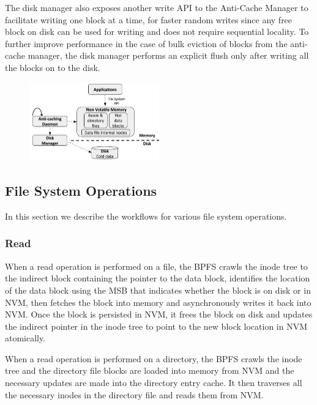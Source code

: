 The disk manager also exposes another write API to the Anti-Cache Manager to facilitate writing one block at a time, for faster random writes since any free block on disk can be used for writing and does not require sequential locality. To further improve performance in the case of bulk eviction of blocks from the anti-cache manager, the disk manager performs an explicit flush only after writing all the blocks on to the disk.

\begin{figure}
\centering
\vspace{-0.2in}
\includegraphics[width=0.5\textwidth]{figs/bpfs.pdf}
\vspace{-0.2in}
\end{figure}

\subsection{File System Operations}
In this section we describe the workflows for various file system operations.
\subsubsection{Read}
When a read operation is performed on a file, the BPFS crawls the inode tree to the indirect block containing the pointer to the data block, identifies the location of the data block using the MSB that indicates whether the block is on disk or in NVM, then fetches the block into memory and asynchronously writes it back into NVM. Once the block is persisted in NVM, it frees the block on disk and updates the indirect pointer in the inode tree to point to the new block location in NVM atomically.

When a read operation is performed on a directory, the BPFS crawls the inode tree and the directory file blocks are loaded into memory from NVM and the necessary updates are made into the directory entry cache. It then traverses all the necessary inodes in the directory file and reads them from NVM.

